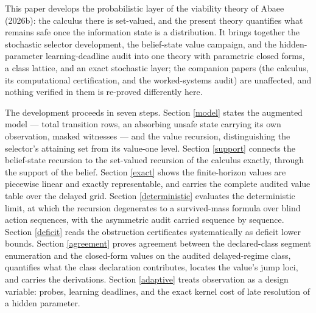 \documentclass[10pt,twocolumn]{article}
\theoremstyle{plain}
\theoremstyle{definition}
\theoremstyle{remark}
\begin{document}
This paper develops the probabilistic layer of the viability theory of
Abaee (2026b): the calculus there is set-valued, and the present theory
quantifies what remains safe once the information state is a
distribution. It brings together the stochastic selector development, the
belief-state value campaign, and the hidden-parameter learning-deadline
audit into one theory with parametric closed forms, a class lattice, and
an exact stochastic layer; the companion papers (the calculus, its
computational certification, and the worked-systems audit) are unaffected,
and nothing verified in them is re-proved differently here.

The development proceeds in seven steps. Section \ref{model} states the
augmented model --- total transition rows, an absorbing unsafe state
carrying its own observation, masked witnesses --- and the value recursion,
distinguishing the selector's attaining set from its value-one level.
Section \ref{support} connects the belief-state recursion to the
set-valued recursion of the calculus exactly, through the support of the
belief. Section \ref{exact} shows the finite-horizon values are piecewise
linear and exactly representable, and carries the complete audited value
table over the delayed grid. Section \ref{deterministic} evaluates the
deterministic limit, at which the recursion degenerates to a
survived-mass formula over blind action sequences, with the asymmetric
audit carried sequence by sequence. Section \ref{deficit} reads the
obstruction certificates systematically as deficit lower bounds. Section \ref{agreement} proves agreement between the declared-class
segment enumeration and the closed-form values on the audited
delayed-regime class,
quantifies what the class declaration contributes, locates the value's
jump loci, and carries the derivations. Section \ref{adaptive} treats
observation as a design variable: probes, learning deadlines, and the
exact kernel cost of late resolution of a hidden parameter.
\end{document}
